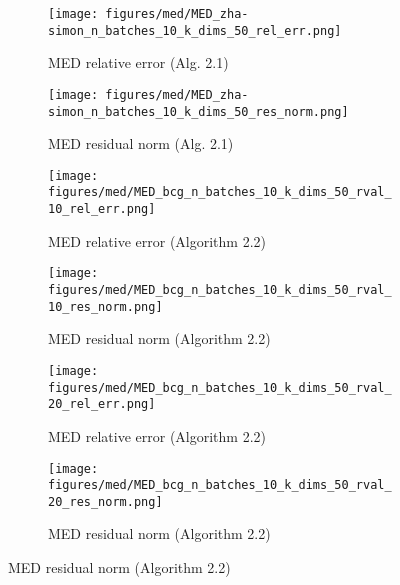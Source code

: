
\begin{figure}[H]
  \centering
  \begin{subfigure}[b]{0.48\textwidth}
    \centering
    \texttt{[image: figures/med/MED\_zha-simon\_n\_batches\_10\_k\_dims\_50\_rel\_err.png]}
    \caption{MED relative error (Alg. 2.1)}
  \end{subfigure}
  \hfill
  \begin{subfigure}[b]{0.48\textwidth}
    \centering
    \texttt{[image: figures/med/MED\_zha-simon\_n\_batches\_10\_k\_dims\_50\_res\_norm.png]}
    \caption{MED residual norm (Alg. 2.1)}
  \end{subfigure}
  \hfill
  \begin{subfigure}[b]{0.48\textwidth}
    \centering
    \texttt{[image: figures/med/MED\_bcg\_n\_batches\_10\_k\_dims\_50\_rval\_10\_rel\_err.png]}
    \caption{MED relative error (Algorithm 2.2)}
  \end{subfigure}
  \hfill
  \begin{subfigure}[b]{0.48\textwidth}
    \centering
    \texttt{[image: figures/med/MED\_bcg\_n\_batches\_10\_k\_dims\_50\_rval\_10\_res\_norm.png]}
    \caption{MED residual norm (Algorithm 2.2)}
  \end{subfigure}
  \hfill
  \begin{subfigure}[b]{0.48\textwidth}
    \centering
    \texttt{[image: figures/med/MED\_bcg\_n\_batches\_10\_k\_dims\_50\_rval\_20\_rel\_err.png]}
    \caption{MED relative error (Algorithm 2.2)}
  \end{subfigure}
  \hfill
  \begin{subfigure}[b]{0.48\textwidth}
    \centering
    \texttt{[image: figures/med/MED\_bcg\_n\_batches\_10\_k\_dims\_50\_rval\_20\_res\_norm.png]}
    \caption{MED residual norm (Algorithm 2.2)}
  \end{subfigure}
\end{figure}

